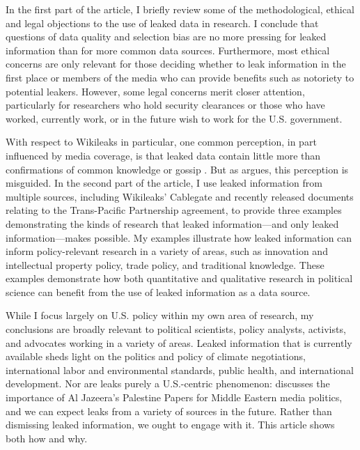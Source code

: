 \documentclass[12pt]{article}
\begin{document}
In the first part of the article, I briefly review some of the methodological, ethical and legal objections to the use of leaked data 
in research. I conclude that 
questions of data quality and selection bias are no more pressing for leaked information 
than for more common data sources. Furthermore, most ethical concerns are only relevant for those deciding 
whether to leak information in the first place or members of the media who can provide benefits 
such as notoriety to potential leakers. However, some legal concerns merit closer attention, particularly for researchers 
who hold security clearances or those who have worked, currently work, or in the future wish to work for the U.S. government.

With respect to Wikileaks in particular, one common perception, in part influenced by media 
coverage, is that leaked data contain little more than confirmations of common knowledge or 
gossip \citep{saunders2011wikileaks,chesterman2011wikileaks}. But as \citet{bob2010wikileaks} argues, this perception is 
misguided. In the second part of the article, I use leaked information from multiple sources, including Wikileaks' 
Cablegate and recently 
released documents relating to the Trans-Pacific Partnership agreement, to provide three examples 
demonstrating the kinds of research that leaked information---and only leaked information---makes possible. 
My examples illustrate how leaked information can inform policy-relevant research in a variety of areas, such as 
innovation and intellectual property policy, trade policy, and traditional knowledge.
These examples demonstrate 
how both quantitative and qualitative research in political science can benefit from the use of 
leaked information as a data source. 

While I focus largely on U.S. policy within my own area of research, my conclusions are broadly relevant 
to political scientists, policy analysts, activists, and advocates working in a variety of areas. 
Leaked information that is currently available sheds light on the politics and policy of climate negotiations, 
international labor and environmental standards, public health, and international development. Nor are leaks 
purely a U.S.-centric phenomenon: \citet{zayani2013jazeeras} discusses the importance of Al Jazeera's 
Palestine Papers for Middle Eastern media politics, and we can expect leaks from a variety of sources in the future. 
Rather than dismissing leaked information, we ought to engage with it. This article shows both how and why.
\end{document}
